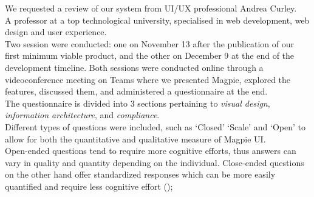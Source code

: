 \noindent We requested a review of our system from UI/UX professional Andrea Curley.\\
A professor at a top technological university, specialised in web development, web design and user experience. \\
\noindent Two session were conducted: one on November 13 after the publication of our first minimum viable product, and the other on December 9 at the end of the development timeline. Both sessions were conducted online through a videoconference meeting on Teams where we presented Magpie, explored the features, discussed them, and administered a questionnaire at the end.\\
The questionnaire is divided into 3 sections pertaining to \emph{visual design}, \emph{information architecture}, and \emph{compliance}.\\
Different types of questions were included, such as `Closed' `Scale' and `Open' to allow for both the quantitative and qualitative measure of Magpie UI.\\
Open-ended questions tend to require more cognitive efforts, thus answers can vary in quality and quantity depending on the individual. Close-ended questions on the other hand offer standardized responses which can be more easily quantified and require less cognitive effort (\cite{mixsurveyquestions2020});
